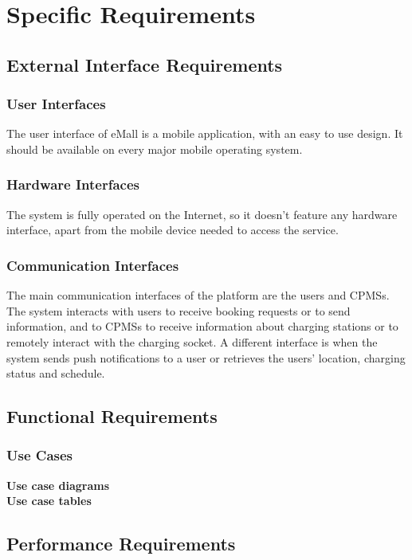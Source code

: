 \section{Specific Requirements}
\subsection{External Interface Requirements}
\subsubsection{User Interfaces}
The user interface of eMall is a mobile application, with an easy to use design.
It should be available on every major mobile operating system.
\subsubsection{Hardware Interfaces}
The system is fully operated on the Internet, so it doesn't feature any hardware interface, apart from the mobile device needed to access the service.
\subsubsection{Communication Interfaces}
The main communication interfaces of the platform are the users and CPMSs.
The system interacts with users to receive booking requests or to send information, and to CPMSs to receive information about charging stations or to remotely interact with the charging socket.
A different interface is when the system sends push notifications to a user or retrieves the users' location, charging status and schedule.
\subsection{Functional Requirements}
\subsubsection{Use Cases}
\textbf{Use case diagrams}\\
\textbf{Use case tables}


\subsection{Performance Requirements}
